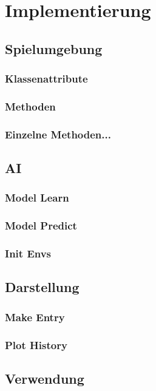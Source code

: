 \section{Implementierung}
\subsection{Spielumgebung}
\subsubsection{Klassenattribute}
\subsubsection{Methoden}
\subsubsection{Einzelne Methoden...}
\subsection{AI}
\subsubsection{Model Learn}
\subsubsection{Model Predict}
\subsubsection{Init Envs}
\subsection{Darstellung}
\subsubsection{Make Entry}
\subsubsection{Plot History}
\subsection{Verwendung}
